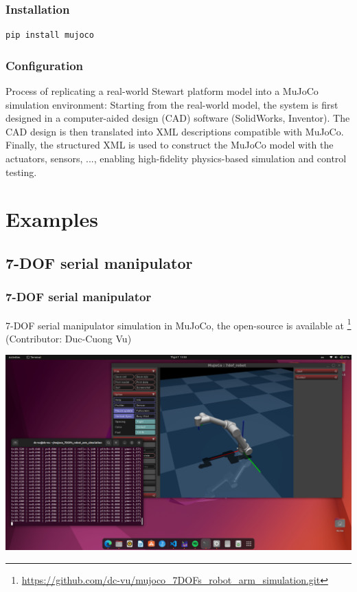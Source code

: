 \documentclass[9pt]{beamer}
\begin{document}
	\begin{frame}[fragile]
		\frametitle{Installation}
		\begin{verbatim}
pip install mujoco
		\end{verbatim}
	\end{frame}

	\begin{frame}
		\frametitle{Configuration}
		\begin{figure}
			\scalebox{0.6}{}
		\end{figure}
		
		Process of replicating a real-world Stewart platform model into a MuJoCo simulation environment: Starting from the real-world model, the system is first designed in a computer-aided design (CAD) software (SolidWorks, Inventor). The CAD design is then translated into XML descriptions compatible with MuJoCo. Finally, the structured XML is used to construct the MuJoCo model with the actuators, sensors, ..., enabling high-fidelity physics-based simulation and control testing.	
	\end{frame}
	

	
	\section{Examples}
		\subsection{7-DOF serial manipulator}
		
		\begin{frame}
			\frametitle{7-DOF serial manipulator}
			7-DOF serial manipulator simulation in MuJoCo, the open-source is available at \footnote{\href{https://github.com/dc-vu/mujoco_7DOFs_robot_arm_simulation.git}{https://github.com/dc-vu/mujoco\_7DOFs\_robot\_arm\_simulation.git}} (Contributor: Duc-Cuong Vu)
			\begin{center}
				\includegraphics[width=0.9\linewidth]{images/mjc-7dof}
			\end{center}
			
		\end{frame}
	
\end{document}

